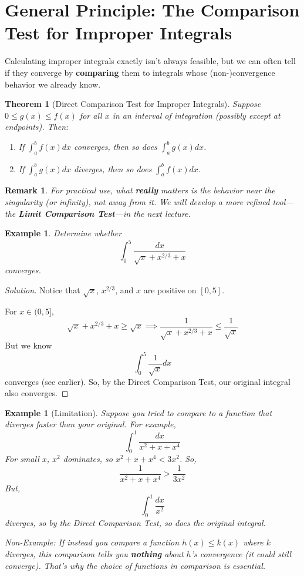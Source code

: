 \documentclass[12pt]{article}
\newtheorem{theorem}[definition]{Theorem}
\newtheorem{example}[definition]{Example}
\newtheorem{remark}[definition]{Remark}
\begin{document}
\section{General Principle: The Comparison Test for Improper Integrals}

Calculating improper integrals exactly isn’t always feasible, but we can often tell if they converge by \textbf{comparing} them to integrals whose (non-)convergence behavior we already know.

\begin{theorem}[Direct Comparison Test for Improper Integrals]
Suppose $0 \leq g(x) \leq f(x)$ for all $x$ in an interval of integration (possibly except at endpoints). Then:
\begin{enumerate}
    \item If $\int_{a}^{b} f(x) dx$ converges, then so does $\int_{a}^{b} g(x) dx$.
    \item If $\int_{a}^{b} g(x) dx$ diverges, then so does $\int_{a}^{b} f(x) dx$.
\end{enumerate}
\end{theorem}

\begin{remark}
For practical use, what \textbf{really} matters is the behavior near the singularity (or infinity), not away from it. We will develop a more refined tool---the \textbf{Limit Comparison Test}---in the next lecture.
\end{remark}

\begin{example}
Determine whether
\[
\int_0^5 \frac{dx}{\sqrt{x}+x^{2/3}+x}
\]
converges.
\end{example}
\begin{proof}[Solution]
Notice that $\sqrt{x}$, $x^{2/3}$, and $x$ are positive on $[0,5]$.

For $x\in(0,5]$,
\[
\sqrt{x} + x^{2/3} + x \geq \sqrt{x}
\implies
\frac{1}{\sqrt{x} + x^{2/3} + x} \leq \frac{1}{\sqrt{x}}
\]
But we know
\[
\int_0^5 \frac{1}{\sqrt{x}} dx
\]
converges (see earlier). So, by the Direct Comparison Test, our original integral also converges.
\end{proof}

\begin{example}[Limitation]
Suppose you tried to compare to a function that diverges faster than your original. For example,
\[
\int_0^1 \frac{dx}{x^2 + x + x^4}
\]
For small $x$, $x^2$ dominates, so $x^2 + x + x^4 < 3x^2$. So,
\[
\frac{1}{x^2 + x + x^4} > \frac{1}{3x^2}
\]
But,
\[
\int_0^1 \frac{dx}{x^2}
\]
diverges, so by the Direct Comparison Test, so does the original integral.

\color{gray}
\textit{Non-Example:} If instead you compare a function $h(x) \leq k(x)$ where $k$ diverges, this comparison tells you \textbf{nothing} about $h$'s convergence (it could still converge). That's why the choice of functions in comparison is essential.
\color{black}
\end{example}
\end{document}
